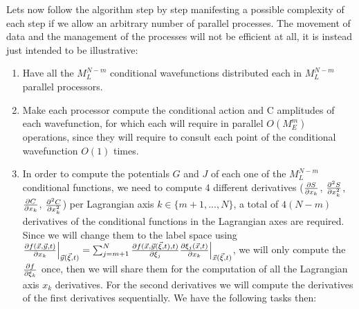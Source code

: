 \documentclass[11pt, a4paper]{article} %
\begin{document}
Lets now follow the algorithm step by step manifesting a possible complexity of each step if we allow an arbitrary number of parallel processes. The movement of data and the management of the processes will not be efficient at all, it is instead just intended to be illustrative:
\begin{enumerate}
\item Have all the $M_L^{N-m}$ conditional wavefunctions distributed each in $M_L^{N-m}$ parallel processors.
\item Make each processor compute the conditional action and C amplitudes of each wavefunction, for which each will require in parallel $O(M_E^m)$ operations, since they will require to consult each point of the conditional wavefunction $O(1)$ times.
\item In order to compute the potentials $G$ and $J$ of each one of the $M_L^{N-m}$ conditional functions, we need to compute 4 different derivatives ($\pdv{S}{x_k}$, $\pdv[2]{S}{x_k}$, $\pdv{C}{x_k}$, $\pdv[2]{C}{x_k}$) per Lagrangian axis $k\in\{m+1,...,N\}$, a total of $4(N-m)$ derivatives of the conditional functions in the Lagrangian axes are required. Since we will change them to the label space using $\pdv{f(\vec{x}, \vec{y},t)}{x_k}\Big\rvert_{\vec{y}(\vec{\xi},t)}=\sum_{j=m+1}^N \pdv{f(\vec{x},\vec{y}(\vec{\xi},t),t)}{\xi_j} \pdv{\xi_j(\vec{x},t)}{x_k}\Big\rvert_{\vec{x}(\vec{\xi},t)}$, we will only compute the $\pdv{f}{\xi_k}$ once, then we will share them for the computation of all the Lagrangian axis $x_k$ derivatives. For the second derivatives we will compute the derivatives of the first derivatives sequentially. We have the following tasks then:
\begin{enumerate}

\end{enumerate}
\end{enumerate}
\end{document}
